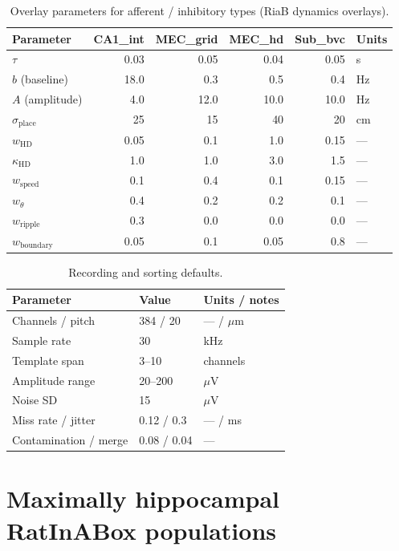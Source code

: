 \documentclass[11pt,a4paper]{article}
\begin{document}
\begin{table}[h]
\centering
\caption{Overlay parameters for afferent / inhibitory types (RiaB dynamics overlays).}
\label{tab:rate-params-afferent}
\small
\begin{tabular}{@{}lrrrrl@{}}
\toprule
Parameter & CA1\_int & MEC\_grid & MEC\_hd & Sub\_bvc & Units \\
\midrule
$\tau$ & 0.03 & 0.05 & 0.04 & 0.05 & s \\
$b$ (baseline) & 18.0 & 0.3 & 0.5 & 0.4 & Hz \\
$A$ (amplitude) & 4.0 & 12.0 & 10.0 & 10.0 & Hz \\
$\sigma_{\mathrm{place}}$ & 25 & 15 & 40 & 20 & cm \\
$w_{\mathrm{HD}}$ & 0.05 & 0.1 & 1.0 & 0.15 & --- \\
$\kappa_{\mathrm{HD}}$ & 1.0 & 1.0 & 3.0 & 1.5 & --- \\
$w_{\mathrm{speed}}$ & 0.1 & 0.4 & 0.1 & 0.15 & --- \\
$w_\theta$ & 0.4 & 0.2 & 0.2 & 0.1 & --- \\
$w_{\mathrm{ripple}}$ & 0.3 & 0.0 & 0.0 & 0.0 & --- \\
$w_{\mathrm{boundary}}$ & 0.05 & 0.1 & 0.05 & 0.8 & --- \\
\bottomrule
\end{tabular}
\end{table}

\begin{table}[h]
\centering
\caption{Recording and sorting defaults.}
\label{tab:drift-rec}
\small
\begin{tabular}{@{}lll@{}}
\toprule
Parameter & Value & Units / notes \\
\midrule
Channels / pitch & 384 / 20 & --- / $\mu$m \\
Sample rate & 30 & kHz \\
Template span & 3--10 & channels \\
Amplitude range & 20--200 & $\mu$V \\
Noise SD & 15 & $\mu$V \\
Miss rate / jitter & 0.12 / 0.3 & --- / ms \\
Contamination / merge & 0.08 / 0.04 & --- \\
\bottomrule
\end{tabular}
\end{table}

\section{Maximally hippocampal RatInABox populations}
\label{sec:riab-pops}
\end{document}
